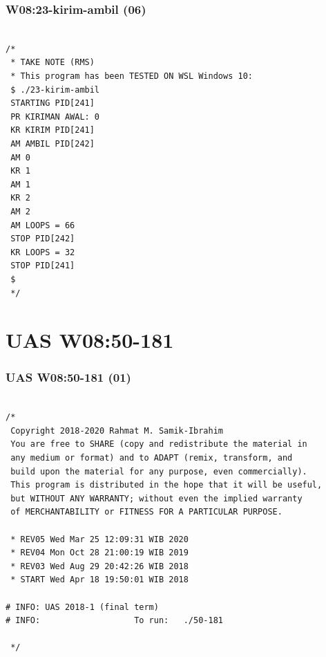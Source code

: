 \documentclass[aspectratio=169, xcolor=table, notheorems, hyperref={pdfpagelabels=false}]{beamer}
\begin{document}
\begin{frame}[fragile]
\frametitle{W08:23-kirim-ambil (06)}
\begin{lstlisting}[basicstyle=\ttfamily\small]        %  65
% \begin{lstlisting}[basicstyle=\ttfamily\large]        %  54

/*
 * TAKE NOTE (RMS)
 * This program has been TESTED ON WSL Windows 10:
 $ ./23-kirim-ambil 
 STARTING PID[241]
 PR KIRIMAN AWAL: 0
 KR KIRIM PID[241]
 AM AMBIL PID[242]
 AM 0
 KR 1
 AM 1
 KR 2
 AM 2
 AM LOOPS = 66
 STOP PID[242]
 KR LOOPS = 32
 STOP PID[241]
 $
 */

\end{lstlisting}
\end{frame}

\section{UAS W08:50-181}
\begin{frame}[fragile]
\frametitle{UAS W08:50-181 (01)}
\begin{lstlisting}[basicstyle=\ttfamily\small]        %  65
% \begin{lstlisting}[basicstyle=\ttfamily\large]        %  54

/*
 Copyright 2018-2020 Rahmat M. Samik-Ibrahim
 You are free to SHARE (copy and redistribute the material in
 any medium or format) and to ADAPT (remix, transform, and 
 build upon the material for any purpose, even commercially).
 This program is distributed in the hope that it will be useful,
 but WITHOUT ANY WARRANTY; without even the implied warranty 
 of MERCHANTABILITY or FITNESS FOR A PARTICULAR PURPOSE.

 * REV05 Wed Mar 25 12:09:31 WIB 2020
 * REV04 Mon Oct 28 21:00:19 WIB 2019
 * REV03 Wed Aug 29 20:42:26 WIB 2018
 * START Wed Apr 18 19:50:01 WIB 2018

# INFO: UAS 2018-1 (final term)
# INFO:                   To run:   ./50-181 

 */

\end{lstlisting}
\end{frame}
\end{document}
